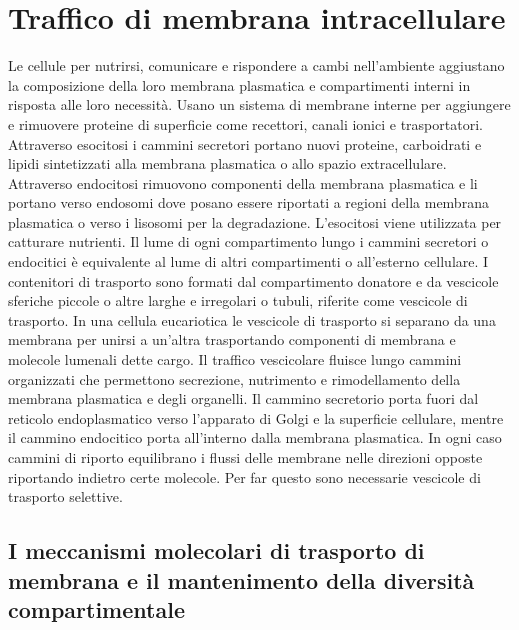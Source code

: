 \chapter{Traffico di membrana intracellulare}
Le cellule per nutrirsi, comunicare e rispondere a cambi nell'ambiente aggiustano la composizione della loro membrana plasmatica e compartimenti interni in risposta alle loro 
necessit\`a. Usano un sistema di membrane interne per aggiungere e rimuovere proteine di superficie come recettori, canali ionici e trasportatori. Attraverso esocitosi i cammini 
secretori portano nuovi proteine, carboidrati e lipidi sintetizzati alla membrana plasmatica o allo spazio extracellulare. Attraverso endocitosi rimuovono componenti della membrana 
plasmatica e li portano verso endosomi dove posano essere riportati a regioni della membrana plasmatica o verso i lisosomi per la degradazione. L'esocitosi viene utilizzata per 
catturare nutrienti. Il lume di ogni compartimento lungo i cammini secretori o endocitici \`e equivalente al lume di altri compartimenti o all'esterno cellulare. I contenitori
di trasporto sono formati dal compartimento donatore e da vescicole sferiche piccole o altre larghe e irregolari o tubuli, riferite come vescicole di trasporto. In una cellula 
eucariotica le vescicole di trasporto si separano da una membrana per unirsi a un'altra trasportando componenti di membrana e molecole lumenali dette cargo. Il traffico vescicolare
fluisce lungo cammini organizzati che permettono secrezione, nutrimento e rimodellamento della membrana plasmatica e degli organelli. Il cammino secretorio porta fuori dal reticolo 
endoplasmatico verso l'apparato di Golgi e la superficie cellulare, mentre il cammino endocitico porta all'interno dalla membrana plasmatica. In ogni caso cammini di riporto equilibrano
i flussi delle membrane nelle direzioni opposte riportando indietro certe molecole. Per far questo sono necessarie vescicole di trasporto selettive. 
\section{I meccanismi molecolari di trasporto di membrana e il mantenimento della diversit\`a compartimentale}
